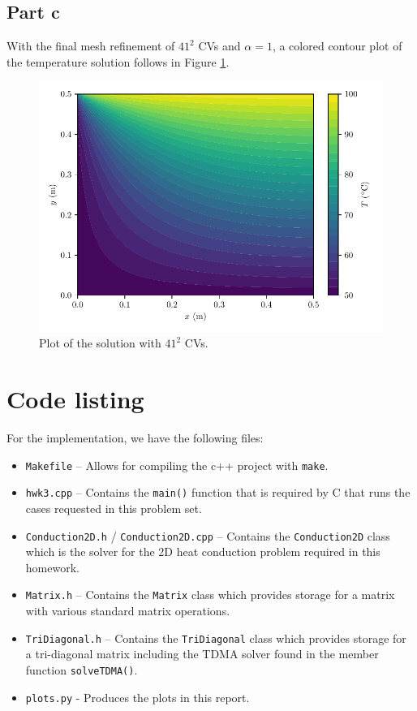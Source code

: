 \documentclass{article}
\begin{document}
\subsection*{Part c}

With the final mesh refinement of $41^2$ CVs and $\alpha = 1$, a colored contour plot of the temperature solution follows in Figure \ref{fig:c}.

\begin{figure}[H]
	\centering
	\includegraphics[width=0.7\linewidth]{../results/c}
	\caption{Plot of the solution with $41^2$ CVs.}
	\label{fig:c}
\end{figure}

\section*{Code listing}

For the implementation, we have the following files:
\begin{itemize}
	\item \texttt{Makefile} -- Allows for compiling the c++ project with \texttt{make}.
	\item \texttt{hwk3.cpp} -- Contains the \texttt{main()} function that is required by C that runs the cases requested in this problem set.
	\item \texttt{Conduction2D.h} / \texttt{Conduction2D.cpp} -- Contains the \texttt{Conduction2D} class which is the solver for the 2D heat conduction problem required in this homework.
	\item \texttt{Matrix.h} -- Contains the \texttt{Matrix} class which provides storage for a matrix with various standard matrix operations.
	\item \texttt{TriDiagonal.h} -- Contains the \texttt{TriDiagonal} class which provides storage for a tri-diagonal matrix including the TDMA solver found in the member function \texttt{solveTDMA()}.
	\item \texttt{plots.py} - Produces the plots in this report.
\end{itemize}
\end{document}
